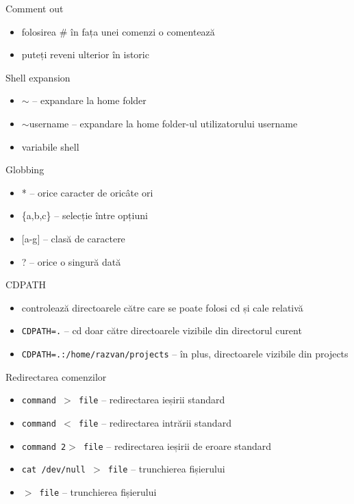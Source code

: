 \documentclass{beamer}
\begin{document}
\begin{frame}{Comment out}
	\begin{itemize}
		\item folosirea \# în fața unei comenzi o comentează
		\item puteți reveni ulterior în istoric
	\end{itemize}
\end{frame}

\begin{frame}{Shell expansion}
	\begin{itemize}
		\item $\sim$ -- expandare la home folder
		\item $\sim$username -- expandare la home folder-ul utilizatorului
		username
		\item variabile shell
	\end{itemize}
\end{frame}

\begin{frame}{Globbing}
	\begin{itemize}
		\item * -- orice caracter de oricâte ori
		\item \{a,b,c\} -- selecție între opțiuni
		\item $[$a-g$]$ -- clasă de caractere
		\item ? -- orice o singură dată
	\end{itemize}
\end{frame}

\begin{frame}{CDPATH}
	\begin{itemize}
		\item controlează directoarele către care se poate folosi cd și cale
		relativă
		\item \texttt{CDPATH=.} -- cd doar către directoarele vizibile din directorul
		curent
		\item \texttt{CDPATH=.:/home/razvan/projects} -- în plus, directoarele vizibile
		din projects
	\end{itemize}
\end{frame}

\begin{frame}{Redirectarea comenzilor}
	\begin{itemize}
		\item \texttt{command $>$ file} -- redirectarea ieșirii standard
		\item \texttt{command $<$ file} -- redirectarea intrării standard
		\item \texttt{command 2$>$ file} -- redirectarea ieșirii de eroare standard
		\item \texttt{cat /dev/null $>$ file} -- trunchierea fișierului
		\item \texttt{$>$ file} -- trunchierea fișierului
	\end{itemize}
\end{frame}
\end{document}
